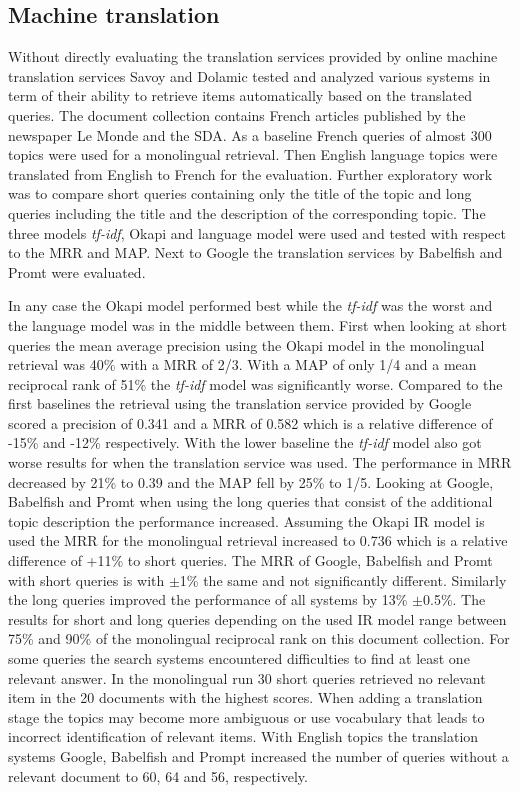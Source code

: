\documentclass[journal]{IEEEtran}
\begin{document}
\subsection{Machine translation}
Without directly evaluating the translation services provided by online machine translation services Savoy and Dolamic \cite{savoy09} tested and analyzed various systems in term of their ability to retrieve items automatically based on the translated queries.
The document collection contains French articles published by the newspaper Le Monde and the SDA.
As a baseline French queries of almost 300 topics were used for a monolingual retrieval.
Then English language topics were translated from English to French for the evaluation.
Further exploratory work was to compare short queries containing only the title of the topic and long queries including the title and the description of the corresponding topic.
The three models \textit{tf-idf}, Okapi and language model were used and tested with respect to the MRR and MAP.
Next to Google the translation services by Babelfish and Promt were evaluated.

In any case the Okapi model performed best while the \textit{tf-idf} was the worst and the language model was in the middle between them.
First when looking at short queries the mean average precision using the Okapi model in the monolingual retrieval was 40\% with a MRR of 2/3.
With a MAP of only 1/4 and a mean reciprocal rank of 51\% the \textit{tf-idf} model was significantly worse.
Compared to the first baselines the retrieval using the translation service provided by Google scored a precision of 0.341 and a MRR of 0.582 which is a relative difference of -15\% and -12\% respectively.
With the lower baseline the \textit{tf-idf} model also got worse results for when the translation service was used.
The performance in MRR decreased by 21\% to 0.39 and the MAP fell by 25\% to 1/5.
Looking at Google, Babelfish and Promt when using the long queries that consist of the additional topic description the performance increased.
Assuming the Okapi IR model is used the MRR for the monolingual retrieval increased to 0.736 which is a relative difference of +11\% to short queries.
The MRR of Google, Babelfish and Promt with short queries is with $\pm$1\% the same and not significantly different.
Similarly the long queries improved the performance of all systems by 13\% $\pm$0.5\%.
The results for short and long queries depending on the used IR model range between 75\% and 90\% of the monolingual reciprocal rank on this document collection.
For some queries the search systems encountered difficulties to find at least one relevant answer.
In the monolingual run 30 short queries retrieved no relevant item in the 20 documents with the highest scores.
When adding a translation stage the topics may become more ambiguous or use vocabulary that leads to incorrect identification of relevant items.
With English topics the translation systems Google, Babelfish and Prompt increased the number of queries without a relevant document to 60, 64 and 56, respectively.
\end{document}
